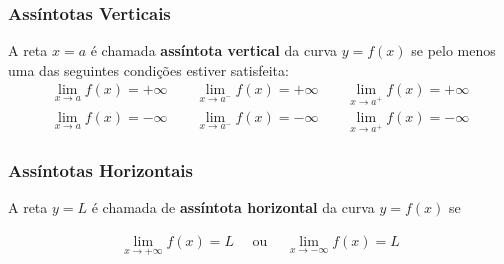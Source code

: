 \begin{tcolorbox}
\subsubsection*{Assíntotas Verticais}
A reta $x=a$ é chamada \textbf{assíntota vertical} da curva $y=f(x)$ se pelo menos uma das seguintes condições estiver satisfeita:
\begin{align*}
    \lim\limits_{x\to a}f(x)=+\infty \qquad \lim\limits_{x\to a^-}f(x)=+\infty \qquad \lim\limits_{x\to a^+}f(x)=+\infty\\
    \lim\limits_{x\to a}f(x)=-\infty \qquad \lim\limits_{x\to a^-}f(x)=-\infty \qquad \lim\limits_{x\to a^+}f(x)=-\infty
\end{align*}

\subsubsection*{Assíntotas Horizontais}
A reta $y=L$ é chamada de \textbf{assíntota horizontal} da curva $y=f(x)$ se

\begin{align*}
    \lim\limits_{x\to +\infty}f(x)=L \quad \text{ ou } \quad  \lim\limits_{x\to -\infty}f(x)=L
\end{align*}
\end{tcolorbox}